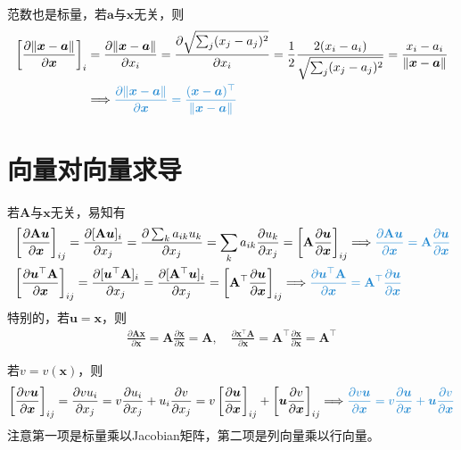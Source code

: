 \documentclass{ctexart}
\newcommand{\blue}[1]{\textcolor{Solarized-blue}{#1}}
\theoremstyle{definition}
\def \av {\bm{a}}
\def \uv {\bm{u}}
\def \xv {\bm{x}}
\def \Av {\mathbf{A}}
\begin{document}
范数也是标量，若$\av$与$\xv$无关，则
\begin{align*}
    \left[ \frac{\partial \| \xv - \av \|}{\partial \xv} \right]_i & = \frac{\partial \| \xv - \av \|}{\partial x_i} = \frac{\partial \sqrt{\sum_j (x_j - a_j)^2}}{\partial x_i} = \frac{1}{2} \frac{2 (x_i - a_i)}{\sqrt{\sum_j (x_j - a_j)^2}} = \frac{x_i - a_i}{\| \xv - \av \|} \\
                                                                   & \Longrightarrow \blue{\frac{\partial \| \xv - \av \|}{\partial \xv} = \frac{(\xv - \av)^\top}{\| \xv - \av \|}}
\end{align*}


\section{向量对向量求导}

若$\Av$与$\xv$无关，易知有
\begin{align*}
     & \left[ \frac{\partial \Av \uv}{\partial \xv} \right]_{ij} = \frac{\partial [\Av \uv]_i}{\partial x_j} = \frac{\partial \sum_k a_{ik} u_k}{\partial x_j} = \sum_k a_{ik} \frac{\partial u_k}{\partial x_j} = \left[ \Av \frac{\partial \uv}{\partial \xv} \right]_{ij} \Longrightarrow \blue{\frac{\partial \Av \uv}{\partial \xv} = \Av \frac{\partial \uv}{\partial \xv}} \\
     & \left[ \frac{\partial \uv^\top \Av}{\partial \xv} \right]_{ij} = \frac{\partial [\uv^\top \Av]_i}{\partial x_j} = \frac{\partial [\Av^\top \uv]_i}{\partial x_j} = \left[ \Av^\top \frac{\partial \uv}{\partial \xv} \right]_{ij} \Longrightarrow \blue{\frac{\partial \uv^\top \Av}{\partial \xv} = \Av^\top \frac{\partial \uv}{\partial \xv}}
\end{align*}
特别的，若$\uv = \xv$，则
\begin{align*}
    \frac{\partial \Av \xv}{\partial \xv} = \Av \frac{\partial \xv}{\partial \xv} = \Av, \quad \frac{\partial \xv^\top \Av}{\partial \xv} = \Av^\top \frac{\partial \xv}{\partial \xv} = \Av^\top
\end{align*}

若$v = v(\xv)$，则
\begin{align*}
    \left[ \frac{\partial v \uv}{\partial \xv} \right]_{ij} = \frac{\partial v u_i}{\partial x_j} = v \frac{\partial u_i}{\partial x_j} + u_i \frac{\partial v}{\partial x_j} = v \left[ \frac{\partial \uv}{\partial \xv} \right]_{ij} + \left[ \uv \frac{\partial v}{\partial \xv} \right]_{ij} \Longrightarrow \blue{\frac{\partial v \uv}{\partial \xv} = v \frac{\partial \uv}{\partial \xv} + \uv \frac{\partial v}{\partial \xv}}
\end{align*}
注意第一项是标量乘以Jacobian矩阵，第二项是列向量乘以行向量。
\end{document}

